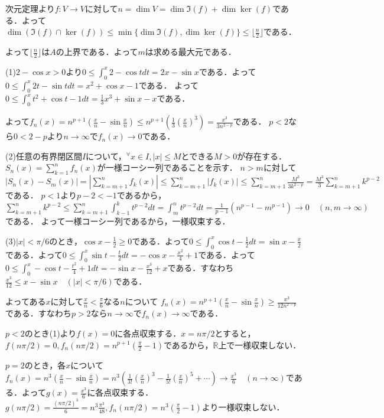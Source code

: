 \documentclass[
		book,
		head_space=20mm,
		foot_space=20mm,
		gutter=10mm,
		line_length=190mm
]{jlreq}
\begin{document}
次元定理より$f \colon V \rightarrow V$に対して$n=\dim V=\dim \Im(f)+\dim \ker(f)$である．よって$\dim (\Im (f) \cap \ker (f))\le \min \{ \dim \Im(f),\dim \ker(f)\} \le \lfloor\frac{n}{2}\rfloor$である．

よって$\lfloor \frac{n}{2} \rfloor$は$A$の上界である．よって$m$は求める最大元である．

(1)$2-\cos x>0$より$0\le \int_0^x 2-\cos tdt=2x-\sin x$である．よって
$0\le \int_0^x 2t-\sin t dt= x^2 +\cos x -1$である．
よって$0\le\int_0^x t^2+\cos t-1 dt=\frac{1}{3}x^3+\sin x-x$である．

よって$f_n(x)=n^{p+1}(\frac{x}{n}-\sin \frac{x}{n})\le n^{p+1}(\frac{1}{3}(\frac{x}{n})^3)=\frac{x^3}{3n^{2-p}}$である．
$p<2$なら$0<2-p$より$n\rightarrow \infty$で$f_n(x)\rightarrow 0$である．

(2)任意の有界閉区間$I$について，$^\forall x \in I,|x|\le M$とできる$M>0$が存在する．
$S_n(x)=\sum_{k=1}^n  f_n(x)$が一様コーシー列であることを示す．
$n>m$に対して$|S_n(x)-S_m(x)|=|\sum_{k=m+1}^n f_k(x)|\le \sum_{k=m+1}^n |f_k(x)|\le \sum_{k=m+1}^n \frac{M^3}{3k^{2-p}}=\frac{M^3}{3}\sum_{k=m+1}^n k^{p-2}$である．
$p<1$より$p-2<-1$であるから，$\sum_{k=m+1}^n k^{p-2} \le \sum_{k=m+1}^n \int_{k-1}^k t^{p-2}dt=\int_m^n t^{p-2}dt=\frac{1}{p-1}(n^{p-1}-m^{p-1})\rightarrow 0\quad(n,m\rightarrow \infty)$である．
よって一様コーシー列であるから，一様収束する．

(3)$|x|<\pi/6$のとき，$\cos x-\frac{1}{2}\ge0$である．よって$0\le\int_0^x \cos t-\frac{1}{2}dt=\sin x-\frac{x}{2}$である．よって$0\le\int_0^x \sin t-\frac{t}{2}dt=-\cos x- \frac{x^2}{4}+1$である．よって$0\le\int_0^x -\cos t-\frac{t^2}{4}+1dt=-\sin x-\frac{x^3}{12}+x$である．すなわち$\frac{x^3}{12}\le x-\sin x\quad(|x|<\pi/6)$である．

よってある$x$に対して$\frac{x}{n}<\frac{\pi}{6}$なる$n$について
$f_n(x)=n^{p+1}(\frac{x}{n}-\sin \frac{x}{n})\ge\frac{x^3}{12n^{2-p}}$である．すなわち$p>2$なら$n\rightarrow \infty$で$f_n(x)\rightarrow \infty$である．

$p<2$のとき(1)より$f(x)=0$に各点収束する．$x=n\pi/2$とすると，$f(n\pi/2)=0,f_n(n\pi/2)=n^{p+1}(\frac{\pi}{2}-1)$であるから，$\mathbb{R}$上で一様収束しない．

$p=2$のとき，各$x$について$f_n(x)=n^3(\frac{x}{n}-\sin \frac{x}{n})=n^3(\frac{1}{3!}(\frac{x}{n})^3-\frac{1}{5!}(\frac{x}{n})^5+\cdots)\rightarrow \frac{x^3}{6}\quad(n\rightarrow \infty)$である．よって$g(x)=\frac{x^3}{6}$に各点収束する．
$g(n\pi/2)=\frac{(n\pi/2)^3}{6}=n^3\frac{\pi^3}{48},f_n(n\pi/2)=n^3(\frac{\pi}{2}-1)$より一様収束しない．
\end{document}
